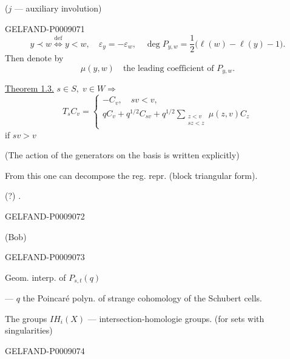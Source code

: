 ($j$ --- auxiliary involution)


\begin{GelfandAdjacentEvidence}{GELFAND-P000907}{1}
\begin{equation*}
y\prec w\overset{\mathrm{def}}{\Longleftrightarrow}y<w,\quad
\varepsilon_y=-\varepsilon_w,\quad
\deg P_{y,w}=\frac12\bigl(\ell(w)-\ell(y)-1\bigr).
\tag{17}
\end{equation*}
Then denote by
\[
\mu(y,w)\quad\text{the leading coefficient of }P_{y,w}.
\]

\uline{Theorem 1.3.} \(s\in S,\;v\in W\Rightarrow\)
\begin{equation*}
T_sC_v=\begin{cases}
-C_v,\quad sv<v,\\
qC_v+q^{1/2}C_{sv}+q^{1/2}\displaystyle\sum_{\substack{z<v\\sz<z}}\mu(z,v)C_z
\end{cases}
\tag{18}
\end{equation*}
if $sv>v$

(The action of the generators on the basis is written explicitly)

From this one can decompose the reg. repr. (block triangular form).

 (?) \quad {}.
\end{GelfandAdjacentEvidence}
\begin{GelfandAdjacentEvidence}{GELFAND-P000907}{2}


(Bob)
\end{GelfandAdjacentEvidence}
\begin{GelfandAdjacentEvidence}{GELFAND-P000907}{3}


Geom. interp. of $P_{s,t}(q)$

--- $q$ the Poincaré polyn. of strange cohomology of the Schubert cells.

The groups $IH_i(X)$ --- intersection-homologie groups. (for sets with singularities)
\end{GelfandAdjacentEvidence}
\begin{GelfandAdjacentEvidence}{GELFAND-P000907}{4}

\end{GelfandAdjacentEvidence}
